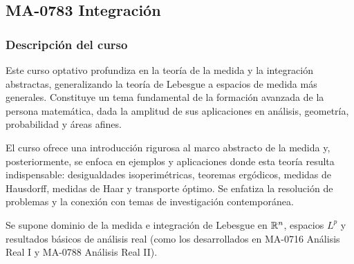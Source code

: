 \newpage
\subsection*{MA-0783 Integración}

\hypertarget{MA0783}{}
\begin{refsection}
\begin{table}[H]
\end{table}

\subsubsection*{Descripción del curso}

Este curso optativo profundiza en la teoría de la medida y la integración abstractas, generalizando la teoría de Lebesgue a espacios de medida más generales. Constituye un tema fundamental de la formación avanzada de la persona matemática, dada la amplitud de sus aplicaciones en análisis, geometría, probabilidad y áreas afines.

El curso ofrece una introducción rigurosa al marco abstracto de la medida y, posteriormente, se enfoca en ejemplos y aplicaciones donde esta teoría resulta indispensable: desigualdades isoperimétricas, teoremas ergódicos, medidas de Hausdorff, medidas de Haar y transporte óptimo. Se enfatiza la resolución de problemas y la conexión con temas de investigación contemporánea.

Se supone dominio de la medida e integración de Lebesgue en $\mathbb{R}^n$, espacios $L^p$ y resultados básicos de análisis real (como los desarrollados en MA-0716 Análisis Real I y MA-0788 Análisis Real II).


\end{refsection}
